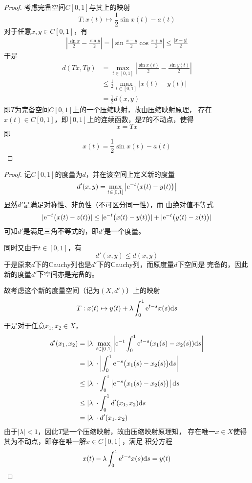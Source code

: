\documentclass[cn]{homework}
\begin{document}
    \problem
    \begin{proof}
        考虑完备空间$C[0,1]$与其上的映射
        \[T:x(t)\mapsto\frac{1}{2}\sin x(t)-a(t)\]
        对于任意$x,y\in C[0,1]$，有
        \[\begin{aligned}
            \left|\frac{\sin x}{2}-\frac{\sin y}{2}\right|
            =\left|\sin\frac{x-y}{2}\cos\frac{x+y}{2}\right|
            \leq\frac{|x-y|}{2}
        \end{aligned}\]
        于是
        \[\begin{aligned}
        d(Tx,Ty)&=\max_{t\in[0,1]}\left|\frac{\sin x(t)}{2}-\frac{\sin y(t)}{2}\right|\\
        &\leq\frac{1}{2}\max_{t\in[0,1]}|x(t)-y(t)|\\
        &=\frac{1}{2}d(x,y)
        \end{aligned}\]
        即$T$为完备空间$C[0,1]$上的一个压缩映射，故由压缩映射原理，
        存在$x(t)\in C[0,1]$，即$[0,1]$上的连续函数，是$T$的不动点，使得
        \[x=Tx\]
        即
        \[x(t)=\frac{1}{2}\sin x(t)-a(t)\]
    \end{proof}

    \problem

    \problem
    \begin{proof}
        记$C[0,1]$的度量为$d$，并在该空间上定义新的度量
        \[d'(x,y)=\max_{t\in[0,1]}\left|\mathrm e^{-t}\big(x(t)-y(t)\big)\right|\]
        显然$d'$是满足对称性、非负性（不可区分同一性），而
        由绝对值不等式
        \[|\mathrm e^{-t}\big(x(t)-z(t))|\leq
        |\mathrm e^{-t}\big(x(t)-y(t)\big)|+|\mathrm e^{-t}\big(y(t)-z(t)\big)|\]
        可知$d'$是满足三角不等式的，即$d'$是一个度量。

        同时又由于$t\in[0,1]$，有
        \[d'(x,y)\leq d(x,y)\]
        于是原来$d$下的Cauchy列也是$d'$下的Cauchy列，而原度量$d$下空间是
        完备的，因此新的度量$d'$下空间亦是完备的。

        故考虑这个新的度量空间（记为$(X,d')$）上的映射
        \[T:x(t)\mapsto y(t)+\lambda\int_0^1\mathrm e^{t-s}x(s)\mathrm d s\]
        于是对于任意$x_1,x_2\in X$，
        \[\begin{aligned}
            d'(x_1,x_2)&=|\lambda|\max_{t\in[0,1]}
            \left|\mathrm e^{-t}\int_0^1\mathrm e^{t-s}(x_1(s)-x_2(s))\mathrm d s\right|\\
            &=|\lambda|\cdot
            \left|\int_0^1\mathrm e^{-s}\big(x_1(s)-x_2(s)\big)\mathrm d s\right|\\
            &\leq|\lambda|\cdot
            \int_0^1\left|\mathrm e^{-s}\big(x_1(s)-x_2(s)\big)\right|\mathrm d s\\
            &\leq|\lambda|\cdot\int_0^1d'(x_1,x_2)\mathrm d s\\
            &=|\lambda|\cdot d'(x_1,x_2)
        \end{aligned}\]
        由于$|\lambda|<1$，因此$T$是一个压缩映射，故由压缩映射原理知，
        存在唯一$x\in X$使得其为不动点，即存在唯一解$x\in C[0,1]$，满足
        积分方程
        \[x(t)-\lambda\int_0^1\mathrm e^{t-s}x(s)\mathrm d s=y(t)\]
    \end{proof}
\end{document}
